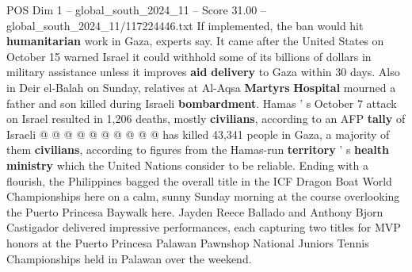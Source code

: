 \begin{textsample}{POS Dim 1 – global\_south\_2024\_11 – Score 31.00 – global\_south\_2024\_11/117224446.txt}
If implemented, the ban would hit \textbf{humanitarian} work in Gaza, experts say.
It came after the United States on October 15 warned Israel it could withhold some of its billions of dollars in military assistance unless it improves \textbf{aid} \textbf{delivery} to Gaza within 30 days.
Also in Deir el-Balah on Sunday, relatives at Al-Aqsa \textbf{Martyrs} \textbf{Hospital} mourned a father and son killed during Israeli \textbf{bombardment}.
Hamas ' s October 7 attack on Israel resulted in 1,206 deaths, mostly \textbf{civilians}, according to an AFP \textbf{tally} of Israeli @ @ @ @ @ @ @ @ @ @ has killed 43,341 people in Gaza, a majority of them \textbf{civilians}, according to figures from the Hamas-run \textbf{territory} ' s \textbf{health} \textbf{ministry} which the United Nations consider to be reliable.
Ending with a flourish, the Philippines bagged the overall title in the ICF Dragon Boat World Championships here on a calm, sunny Sunday morning at the course overlooking the Puerto Princesa Baywalk here.
Jayden Reece Ballado and Anthony Bjorn Castigador delivered impressive performances, each capturing two titles for MVP honors at the Puerto Princesa Palawan Pawnshop National Juniors Tennis Championships held in Palawan over the weekend.

\end{textsample}
